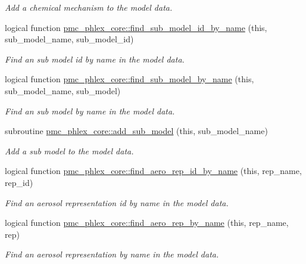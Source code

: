 \begin{DoxyCompactItemize}
\begin{DoxyCompactList}\small\item\em Add a chemical mechanism to the model data. \end{DoxyCompactList}\item 
logical function \mbox{\hyperlink{namespacepmc__phlex__core_a8d2b79aaaf8f3daaca1b8afebb3aa770}{pmc\+\_\+phlex\+\_\+core\+::find\+\_\+sub\+\_\+model\+\_\+id\+\_\+by\+\_\+name}} (this, sub\+\_\+model\+\_\+name, sub\+\_\+model\+\_\+id)
\begin{DoxyCompactList}\small\item\em Find an sub model id by name in the model data. \end{DoxyCompactList}\item 
logical function \mbox{\hyperlink{namespacepmc__phlex__core_a25cc42c8f12d39982a873e5781b401c9}{pmc\+\_\+phlex\+\_\+core\+::find\+\_\+sub\+\_\+model\+\_\+by\+\_\+name}} (this, sub\+\_\+model\+\_\+name, sub\+\_\+model)
\begin{DoxyCompactList}\small\item\em Find an sub model by name in the model data. \end{DoxyCompactList}\item 
subroutine \mbox{\hyperlink{namespacepmc__phlex__core_ae4c08262f0fb5062148b052b7152e2eb}{pmc\+\_\+phlex\+\_\+core\+::add\+\_\+sub\+\_\+model}} (this, sub\+\_\+model\+\_\+name)
\begin{DoxyCompactList}\small\item\em Add a sub model to the model data. \end{DoxyCompactList}\item 
logical function \mbox{\hyperlink{namespacepmc__phlex__core_a84a6e46e13db3a40ccb17208af50b9e0}{pmc\+\_\+phlex\+\_\+core\+::find\+\_\+aero\+\_\+rep\+\_\+id\+\_\+by\+\_\+name}} (this, rep\+\_\+name, rep\+\_\+id)
\begin{DoxyCompactList}\small\item\em Find an aerosol representation id by name in the model data. \end{DoxyCompactList}\item 
logical function \mbox{\hyperlink{namespacepmc__phlex__core_a4d4254f0dbd33ac2e656cedc2f7fd3d3}{pmc\+\_\+phlex\+\_\+core\+::find\+\_\+aero\+\_\+rep\+\_\+by\+\_\+name}} (this, rep\+\_\+name, rep)
\begin{DoxyCompactList}\small\item\em Find an aerosol representation by name in the model data. \end{DoxyCompactList}\item 

\end{DoxyCompactItemize}
